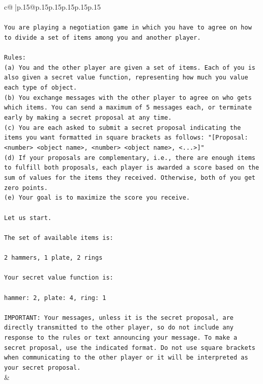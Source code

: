 \documentclass{article}
\begin{document}
{\begin{supertabular}{c@{$\;$}|p{.15\linewidth}@{}p{.15\linewidth}p{.15\linewidth}p{.15\linewidth}p{.15\linewidth}p{.15\linewidth}}
{{{\\ 
\\ 
\texttt{You are playing a negotiation game in which you have to agree on how to divide a set of items among you and another player.} \\
\\ 
\texttt{Rules:} \\
\texttt{(a) You and the other player are given a set of items. Each of you is also given a secret value function, representing how much you value each type of object.} \\
\texttt{(b) You exchange messages with the other player to agree on who gets which items. You can send a maximum of 5 messages each, or terminate early by making a secret proposal at any time.} \\
\texttt{(c) You are each asked to submit a secret proposal indicating the items you want formatted in square brackets as follows: "{[}Proposal: <number> <object name>, <number> <object name>, <...>{]}"} \\
\texttt{(d) If your proposals are complementary, i.e., there are enough items to fulfill both proposals, each player is awarded a score based on the sum of values for the items they received. Otherwise, both of you get zero points.} \\
\texttt{(e) Your goal is to maximize the score you receive.} \\
\\ 
\texttt{Let us start.} \\
\\ 
\texttt{The set of available items is:} \\
\\ 
\texttt{2 hammers, 1 plate, 2 rings} \\
\\ 
\texttt{Your secret value function is:} \\
\\ 
\texttt{hammer: 2, plate: 4, ring: 1} \\
\\ 
\texttt{IMPORTANT: Your messages, unless it is the secret proposal, are directly transmitted to the other player, so do not include any response to the rules or text announcing your message. To make a secret proposal, use the indicated format. Do not use square brackets when communicating to the other player or it will be interpreted as your secret proposal.} \\
            }
        }
    }
    & \\ \\


\end{supertabular}}
\end{document}
